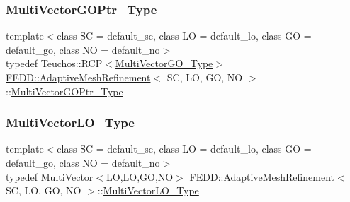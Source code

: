 \subsubsection{\texorpdfstring{Multi\+Vector\+G\+O\+Ptr\+\_\+\+Type}{MultiVectorGOPtr\_Type}}
{\footnotesize\ttfamily template$<$class SC  = default\+\_\+sc, class LO  = default\+\_\+lo, class GO  = default\+\_\+go, class NO  = default\+\_\+no$>$ \\
typedef Teuchos\+::\+R\+CP$<$\hyperlink{classFEDD_1_1AdaptiveMeshRefinement_a582403f1b9f5ba542a6269e1b00a9031}{Multi\+Vector\+G\+O\+\_\+\+Type}$>$ \hyperlink{classFEDD_1_1AdaptiveMeshRefinement}{F\+E\+D\+D\+::\+Adaptive\+Mesh\+Refinement}$<$ SC, LO, GO, NO $>$\+::\hyperlink{classFEDD_1_1AdaptiveMeshRefinement_ab2378e2061f0df4ec2df4a44af300996}{Multi\+Vector\+G\+O\+Ptr\+\_\+\+Type}}

\mbox{\label{classFEDD_1_1AdaptiveMeshRefinement_ae48fff0bc9a94bc0332516f1d1e05d92}} 
\subsubsection{\texorpdfstring{Multi\+Vector\+L\+O\+\_\+\+Type}{MultiVectorLO\_Type}}
{\footnotesize\ttfamily template$<$class SC  = default\+\_\+sc, class LO  = default\+\_\+lo, class GO  = default\+\_\+go, class NO  = default\+\_\+no$>$ \\
typedef Multi\+Vector$<$LO,LO,GO,NO$>$ \hyperlink{classFEDD_1_1AdaptiveMeshRefinement}{F\+E\+D\+D\+::\+Adaptive\+Mesh\+Refinement}$<$ SC, LO, GO, NO $>$\+::\hyperlink{classFEDD_1_1AdaptiveMeshRefinement_ae48fff0bc9a94bc0332516f1d1e05d92}{Multi\+Vector\+L\+O\+\_\+\+Type}}

\mbox{\label{classFEDD_1_1AdaptiveMeshRefinement_a838fdef10af2d85bf1259037b821019e}} 
